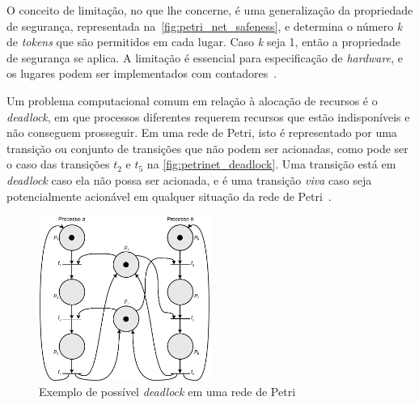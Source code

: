 O conceito de limitação, no que lhe concerne, é uma generalização da propriedade de segurança, representada na~\autoref{fig:petri_net_safeness}, e determina o número \textit{k} de \textit{tokens} que são permitidos em cada lugar. Caso \textit{k} seja 1, então a propriedade de segurança se aplica. A limitação é essencial para especificação de \textit{hardware}, e os lugares podem ser implementados com contadores~\cite{peterson:1981}.

Um problema computacional comum em relação à alocação de recursos é o \textit{deadlock}, em que processos diferentes requerem recursos que estão indisponíveis e não conseguem prosseguir. Em uma rede de Petri, isto é representado por uma transição ou conjunto de transições que não podem ser acionadas, como pode ser o caso das transições $t_2$ e $t_5$ na \autoref{fig:petrinet_deadlock}. Uma transição está em \textit{deadlock} caso ela não possa ser acionada, e é uma transição \textit{viva} caso seja potencialmente acionável em qualquer situação da rede de Petri~\cite{peterson:1981}.

\begin{figure}[ht]
	\caption{\label{fig:petrinet_deadlock}Exemplo de possível \textit{deadlock} em uma rede de Petri}
	\begin{center}
	    \includegraphics[width=0.5\textwidth]{resources/petri_net_peterson_deadlock}
	\end{center}
\end{figure}



